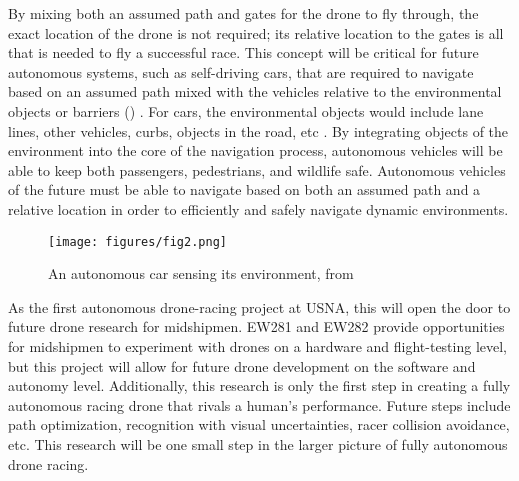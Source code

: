 By mixing both an assumed path and gates for the drone to fly through, the exact location of the drone is not required; its relative location to the gates is all that is needed to fly a successful race. This concept will be critical for future autonomous systems, such as self-driving cars, that are required to navigate based on an assumed path mixed with the vehicles relative to the environmental objects or barriers () \cite{iot2018how}. For cars, the environmental objects would include lane lines, other vehicles, curbs, objects in the road, etc \cite{rayej2014how}. By integrating objects of the environment into the core of the navigation process, autonomous vehicles will be able to keep both passengers, pedestrians, and wildlife safe. Autonomous vehicles of the future must be able to navigate based on both an assumed path and a relative location in order to efficiently and safely navigate dynamic environments.  
\begin{figure}[hb]
\begin{center}
\texttt{[image: figures/fig2.png]}
\end{center}
\caption{An autonomous car sensing its environment, from \cite{someone}}
\label{fig:2}
\end{figure}

As the first autonomous drone-racing project at USNA, this will open the door to future drone research for midshipmen. EW281 and EW282 provide opportunities for midshipmen to experiment with drones on a hardware and flight-testing level, but this project will allow for future drone development on the software and autonomy level. Additionally, this research is only the first step in creating a fully autonomous racing drone that rivals a human’s performance. Future steps include path optimization, recognition with visual uncertainties, racer collision avoidance, etc. This research will be one small step in the larger picture of fully autonomous drone racing.

